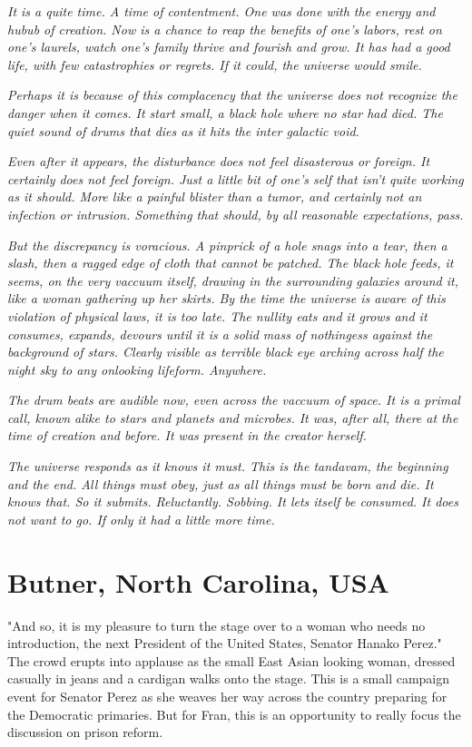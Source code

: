 \documentclass{article}
\begin{document}
\emph{It is a quite time. A time of contentment. One was done with the energy and hubub of creation. Now is a chance to reap the benefits of one's labors, rest on one's laurels, watch one's family thrive and fourish and grow. It has had a good life, with few catastrophies or regrets. If it could, the universe would smile.}

\emph{Perhaps it is because of this complacency that the universe does not recognize the danger when it comes. It start small, a black hole where no star had died. The quiet sound of drums that dies as it hits the inter galactic void.} 

\emph{Even after it appears, the disturbance does not feel disasterous or foreign. It certainly does not feel foreign. Just a little bit of one's self that isn't quite working as it should. More like a painful blister than a tumor, and certainly not an infection or intrusion. Something that should, by all reasonable expectations, pass.}

\emph{But the discrepancy is voracious. A pinprick of a hole snags into a tear, then a slash, then a ragged edge of cloth that cannot be patched. The black hole feeds, it seems, on the very vaccuum itself, drawing in the surrounding galaxies around it, like a woman gathering up her skirts. By the time the universe is aware of this violation of physical laws, it is too late. The nullity eats and it grows and it consumes, expands, devours until it is a solid mass of nothingess against the background of stars. Clearly visible as terrible black eye arching across half the night sky to any onlooking lifeform. Anywhere.}

\emph{The drum beats are audible now, even across the vaccuum of space. It is a primal call, known alike to stars and planets and microbes. It was, after all, there at the time of creation and before. It was present in the creator herself.}

\emph{The universe responds as it knows it must. This is the tandavam, the beginning and the end. All things must obey, just as all things must be born and die. It knows that. So it submits. Reluctantly. Sobbing. It lets itself be consumed. It does not want to go. If only it had a little more time.}

\section{Butner, North Carolina, USA}

"And so, it is my pleasure to turn the stage over to a woman who needs no introduction, the next President of the United States, Senator Hanako Perez." The crowd erupts into applause as the small East Asian looking woman, dressed casually in jeans and a cardigan walks onto the stage. This is a small campaign event for Senator Perez as she weaves her way across the country preparing for the Democratic primaries. But for Fran, this is an opportunity to really focus the discussion on prison reform. 
\end{document}
